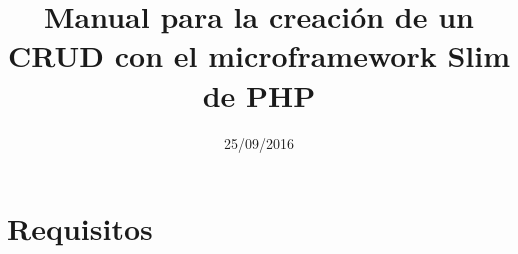 \documentclass[10pt]{article}
\begin{document}
\titlehead{\centering\texttt{[image: hvsf]}}
\title{Manual para la creaci\'on de un CRUD con el microframework Slim de PHP}
\author{}
\date{25/09/2016}
\maketitle
\section*{Requisitos}
\end{document}
